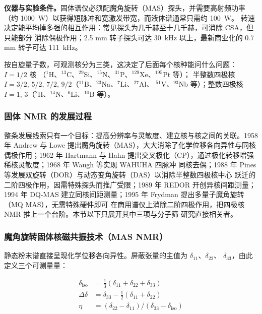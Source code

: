 \begin{measure}
\textbf{仪器与实验条件。}固体谱仪必须配魔角旋转（MAS）探头，并需要高射频功率
（约 \qty{1000}{W}）以获得短脉冲和宽激发带宽，而液体谱通常只需约 \qty{100}{W}。
转速决定能平均掉多强的相互作用：常见探头为几千赫至十几千赫，可消除 CSA，但只能部分
消除偶极作用；2.5 mm 转子探头可达 \qty{30}{kHz} 以上，最新商业化的 0.7 mm 转子可达
\qty{111}{kHz}。
\end{measure}

按自旋量子数，可观测核分为三类，这决定了后面每个核种能问什么问题：$I=1/2$ 核
（$^{1}$H、$^{13}$C、$^{29}$Si、$^{15}$N、$^{31}$P、$^{129}$Xe、$^{195}$Pt 等）；
半整数四极核 $I=3/2,\,5/2,\,7/2,\,9/2$（$^{11}$B、$^{23}$Na、$^{7}$Li、$^{27}$Al、
$^{51}$V、$^{93}$Nb 等）；整数四极核 $I=1,\,3$（$^{2}$H、$^{14}$N、$^{6}$Li、$^{10}$B 等）。

\subsubsection{固体 NMR 的发展过程}

整条发展线索只有一个目标：提高分辨率与灵敏度、建立核与核之间的关联。1958 年 Andrew 与
Lowe 提出魔角旋转（MAS），大大消除了化学位移各向异性与同核偶极作用；1962 年 Hartmann 与
Hahn 提出交叉极化（CP），通过极化转移增强稀核灵敏度；1968 年 Waugh 等实现 WAHUHA 四脉冲
同核去偶；1988 年 Pines 等发展双旋转（DOR）与动态变角旋转（DAS）以消除半整数四极核中心
跃迁的二阶四极作用，因需特殊探头而推广受限；1989 年 REDOR 开创异核间距测量；1994 年
DQ-MAS 建立同核间距测量；1995 年 Frydman 提出多量子魔角旋转（MQ MAS），无需特殊硬件即可
在商用谱仪上消除二阶四极作用，把四极核 NMR 推上一个台阶。本节以下只展开其中三项与分子筛
研究直接相关者。

\subsubsection{魔角旋转固体核磁共振技术（MAS NMR）}

静态粉末谱直接呈现化学位移各向异性。屏蔽张量的主值为 $\delta_{11}$、$\delta_{22}$、
$\delta_{33}$，由此定义三个可测量量：

\begin{equation}
\label{eq:csatensor}
\begin{aligned}
\delta_{\mathrm{iso}} &= \tfrac{1}{3}\left(\delta_{11}+\delta_{22}+\delta_{33}\right)\\
\Delta\delta &= \delta_{33}-\tfrac{1}{2}\left(\delta_{11}+\delta_{22}\right)\\
\eta &= \left(\delta_{22}-\delta_{11}\right)\big/\left(\delta_{33}-\delta_{\mathrm{iso}}\right)
\end{aligned}
\end{equation}

